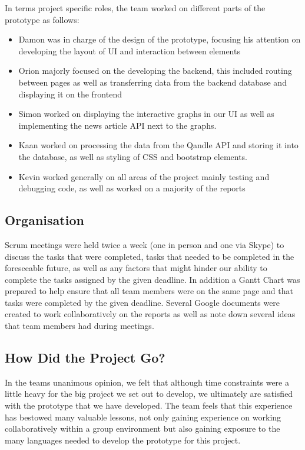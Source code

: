 \documentclass[11pt]{article}
\numberwithin{figure}{section}
\begin{document}
        In terms project specific roles, the team worked on different parts of the prototype as follows:
        
        \begin{itemize} 
            \item Damon was in charge of the design of the prototype, focusing his attention on developing the layout of UI and interaction between elements
            
            \item Orion majorly focused on the developing the backend, this included routing between pages as well as transferring data from the backend database and displaying it on the frontend
            
            \item Simon worked on displaying the interactive graphs in our UI as well as implementing the news article API next to the graphs.
            
            \item Kaan worked on processing the data from the Qandle API and storing it into the database, as well as styling of CSS and bootstrap elements.
            
            \item Kevin worked generally on all areas of the project mainly testing and debugging code, as well as worked on a majority of the reports
        \end{itemize}
    \subsection{Organisation}
        Scrum meetings were held twice a week (one in person and one via Skype) to discuss the tasks that were completed, tasks that needed to be completed in the foreseeable future, as well as any factors that might hinder our ability to complete the tasks assigned by the given deadline. In addition a Gantt Chart was prepared to help ensure that all team members were on the same page and that tasks were completed by the given deadline. Several Google documents were created to work collaboratively on the reports as well as note down several ideas that team members had during meetings.
        
    \subsection{How Did the Project Go?}
        In the teams unanimous opinion, we felt that although time constraints were a little heavy for the big project we set out to develop, we ultimately are satisfied with the prototype that we have developed. The team feels that this experience has bestowed many valuable lessons, not only gaining experience on working collaboratively within a group environment but also gaining exposure to the many languages needed to develop the prototype for this project.
\end{document}

